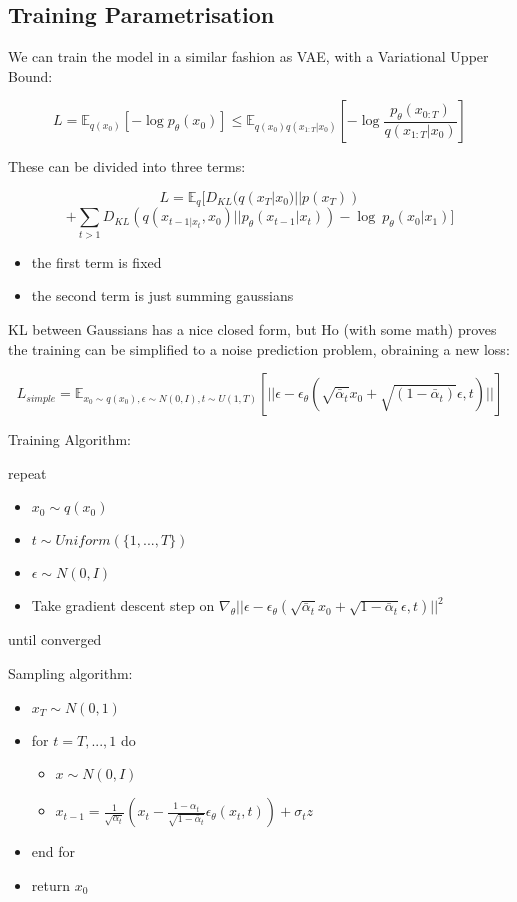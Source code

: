 \documentclass[11pt]{article}
\begin{document}
\subsection{Training Parametrisation}\label{training-parametrisation}

We can train the model in a similar fashion as VAE, with a Variational
Upper Bound:

\[L=\mathbb{E}_{q(x_0)}[-\log p_\theta (x_0)]\le \mathbb{E}_{q(x_0)q(x_{1:T}|x_0)}[-\log \frac{p_{\theta}(x_{0:T})}{q(x_{1:T}|x_0)}]\]

These can be divided into three terms:

\[L=\mathbb{E}_q[D_{KL}(q(x_T|x_0)||p(x_T))\]
\[+\sum_{t>1}D_{KL}(q(x_{t-1|x_t}, x_0)||p_{\theta}(x_{t-1}|x_t))-\log\ p_{\theta}(x_0|x_1)]\]

\begin{itemize}
\tightlist
\item
  the first term is fixed
\item
  the second term is just summing gaussians
\end{itemize}

KL between Gaussians has a nice closed form, but Ho (with some math)
proves the training can be simplified to a noise prediction problem,
obraining a new loss:

\[L_{simple}=\mathbb{E}_{x_0\sim q(x_0), \epsilon \sim N(0, I), t\sim U(1, T)}[||\epsilon - \epsilon_\theta(\sqrt{\bar{\alpha}_t}x_0+\sqrt{(1-\bar{\alpha}_t)}\epsilon, t)||]\]

Training Algorithm:

repeat

\begin{itemize}
\tightlist
\item
  \(x_0 \sim q(x_0)\)
\item
  \(t \sim Uniform(\{ 1, ..., T \})\)
\item
  \(\epsilon \sim N(0, I)\)
\item
  Take gradient descent step on
  \(\nabla_\theta || \epsilon - \epsilon_\theta(\sqrt{\bar{\alpha}_t}x_0+\sqrt{1-\bar{\alpha}_t}\epsilon, t)||^2\)
\end{itemize}

until converged

Sampling algorithm:

\begin{itemize}
\tightlist
\item
  \(x_T \sim N(0, 1)\)
\item
  for \(t=T, ..., 1\) do

  \begin{itemize}
  \tightlist
  \item
    \(x\sim N(0, I)\)
  \item
    \(x_{t-1}=\frac{1}{\sqrt{\alpha_t}}(x_t-\frac{1-\alpha_t}{\sqrt{1-\bar{\alpha}_t}}\epsilon_\theta (x_t, t))+\sigma_t z\)
  \end{itemize}
\item
  end for
\item
  return \(x_0\)
\end{itemize}
\end{document}
